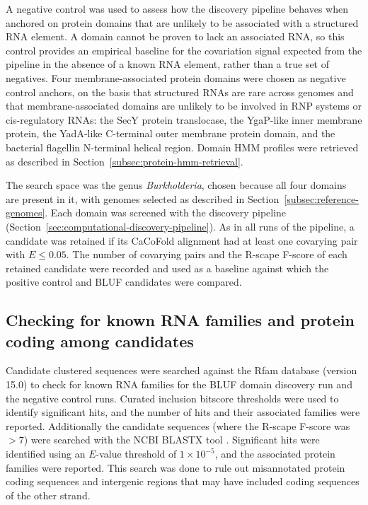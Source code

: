 A negative control was used to assess how the discovery pipeline behaves when anchored on protein domains that are unlikely to be associated with a structured RNA element.
A domain cannot be proven to lack an associated RNA, so this control provides an empirical baseline for the covariation signal expected from the pipeline in the absence of a known RNA element, rather than a true set of negatives.
Four membrane-associated protein domains were chosen as negative control anchors, on the basis that structured RNAs are rare across genomes and that membrane-associated domains are unlikely to be involved in \ac{RNP} systems or cis-regulatory RNAs: the SecY protein translocase, the YgaP-like inner membrane protein, the YadA-like C-terminal outer membrane protein domain, and the bacterial flagellin N-terminal helical region.
Domain \ac{HMM} profiles were retrieved as described in Section~\ref{subsec:protein-hmm-retrieval}.

The search space was the genus \emph{Burkholderia}, chosen because all four domains are present in it, with genomes selected as described in Section~\ref{subsec:reference-genomes}.
Each domain was screened with the discovery pipeline (Section~\ref{sec:computational-discovery-pipeline}).
As in all runs of the pipeline, a candidate was retained if its CaCoFold alignment had at least one covarying pair with $E \le 0.05$.
The number of covarying pairs and the R-scape F-score of each retained candidate were recorded and used as a baseline against which the positive control and \ac{BLUF} candidates were compared.

\subsection{Checking for known RNA families and protein coding among candidates}
\label{subsec:rfam-blastx-check}

Candidate clustered sequences were searched against the Rfam database (version 15.0) \citep{Ontiveros-Palacios2025} to check for known RNA families for the \ac{BLUF} domain discovery run and the negative control runs.
Curated inclusion bitscore thresholds were used to identify significant hits, and the number of hits and their associated families were reported.
Additionally the candidate sequences (where the R-scape F-score was $> 7$) were searched with the \ac{NCBI} BLASTX tool \citep{Altschul1997}.
Significant hits were identified using an $E$-value threshold of $1\times 10^{-5}$, and the associated protein families were reported.
This search was done to rule out misannotated protein coding sequences and intergenic regions that may have included coding sequences of the other strand.

